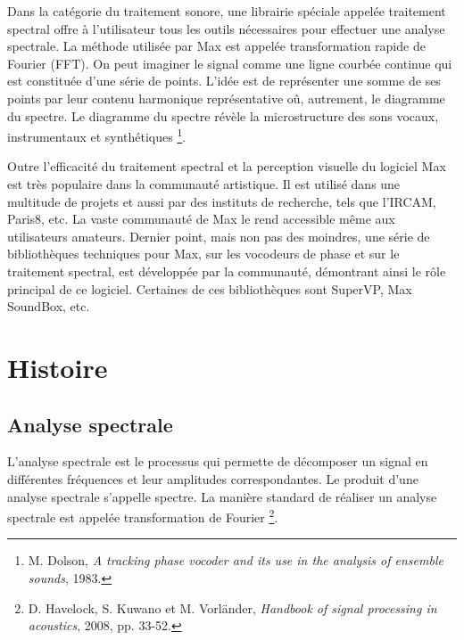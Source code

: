 Dans la catégorie du traitement sonore, une librairie spéciale appelée traitement spectral offre à l'utilisateur tous les outils nécessaires pour effectuer une analyse spectrale. La méthode utilisée par Max est appelée transformation rapide de Fourier (FFT). On peut imaginer le signal comme une ligne courbée continue qui est constituée d’une série de points. L'idée est de représenter une somme de ses points par leur contenu harmonique représentative oû, autrement, le diagramme du spectre. Le diagramme du spectre révèle la microstructure des sons vocaux, instrumentaux et synthétiques \footnote{ M. Dolson, \textit{A tracking phase vocoder and its use in the analysis of ensemble sounds}, 1983.\nocite{dolson1983}}.


Outre l'efficacité du traitement spectral et la perception visuelle du logiciel Max est très populaire dans la communauté artistique. Il est utilisé dans une multitude de projets et aussi par des instituts de recherche, tels que l'IRCAM, Paris8, etc. La vaste communauté de Max le rend accessible même aux utilisateurs amateurs. Dernier point, mais non pas des moindres, une série de bibliothèques techniques pour Max, sur les vocodeurs de phase et sur le traitement spectral, est développée par la communauté, démontrant ainsi le rôle principal de ce logiciel. Certaines de ces bibliothèques sont SuperVP, Max SoundBox, etc.

\section{Histoire}

	\subsection{Analyse spectrale}

L'analyse spectrale est le processus qui permette de décomposer un signal en différentes fréquences et leur amplitudes correspondantes. Le produit d'une analyse spectrale s'appelle spectre. La manière standard de réaliser un analyse spectrale est appelée transformation de Fourier \footnote{D. Havelock, S. Kuwano et M. Vorl{\"a}nder, \textit{Handbook of signal processing in acoustics}, 2008, pp. 33-52. \nocite{havelock2008handbook}}. 


